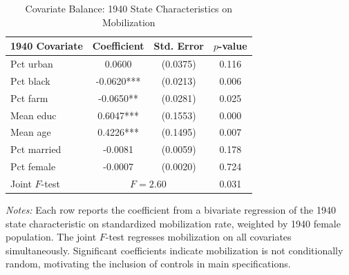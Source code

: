 \begin{table}[htbp]
\centering
\caption{Covariate Balance: 1940 State Characteristics on Mobilization}
\label{tab:balance}
\small
\begin{tabular}{lccc}
\hline\hline
1940 Covariate & Coefficient & Std. Error & $p$-value \\
\hline
Pct urban & 0.0600 & (0.0375) & 0.116 \\
Pct black & -0.0620*** & (0.0213) & 0.006 \\
Pct farm & -0.0650** & (0.0281) & 0.025 \\
Mean educ & 0.6047*** & (0.1553) & 0.000 \\
Mean age & 0.4226*** & (0.1495) & 0.007 \\
Pct married & -0.0081 & (0.0059) & 0.178 \\
Pct female & -0.0007 & (0.0020) & 0.724 \\
\hline
Joint $F$-test & \multicolumn{2}{c}{$F = 2.60$} & 0.031 \\
\hline\hline
\end{tabular}
\begin{tablenotes}
\small
\item \textit{Notes:} Each row reports the coefficient from a bivariate regression of the 1940 state characteristic on standardized mobilization rate, weighted by 1940 female population. The joint $F$-test regresses mobilization on all covariates simultaneously. Significant coefficients indicate mobilization is not conditionally random, motivating the inclusion of controls in main specifications.
\end{tablenotes}
\end{table}
